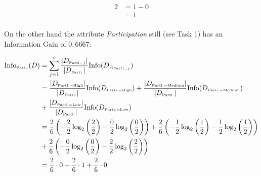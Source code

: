 \documentclass[
english,
smallborders
]{i6prcsht}
\newcommand{\OfSpecificValue}[3]{_{\text{\tiny #1#2#3}}}
\newcommand{\OfAttribute}[1]{_{\text{\tiny #1}}}
\begin{document}
\begin{solution}
\begin{alignat*}{2}
		                                  & = 1 - 0                                                                                                                                                                                                              \\
		                                  & = 1                                                                                                                                                                                                                  \\
	\end{alignat*}

	On the other hand the attribute \textit{Participation} still (see Task 1) has an Information Gain of $0,6667$:

	\begin{alignat*}{3}
		\text{Info}\OfAttribute{Parti.}(D) & = \sum_{j=1}^v \frac{|D\OfAttribute{Parti.$,j$}|}{|D\OfAttribute{Parti.}|} \text{Info}(D_{A\OfAttribute{Parti.$,j$}})                                                                                                                             \\
		                                   & = \frac{|D\OfSpecificValue{Parti.}{=}{High}|}{|D\OfAttribute{Parti.}|} \text{Info}(D\OfSpecificValue{Parti.}{=}{High}) + \frac{|D\OfSpecificValue{Parti.}{=}{Medium}|}{|D\OfAttribute{Parti.}|} \text{Info}(D\OfSpecificValue{Parti.}{=}{Medium}) \\
		                                   & + \frac{|D\OfSpecificValue{Parti.}{=}{Low}|}{|D\OfAttribute{Parti.}|} \text{Info}(D\OfSpecificValue{Parti.}{=}{Low})                                                                                                                              \\
		                                   & = \frac{2}{6} \left(-\frac{2}{2} \log_2\left(\frac{2}{2}\right) - \frac{0}{2} \log_2\left(\frac{0}{2}\right)\right) + \frac{2}{6} \left(-\frac{1}{2} \log_2\left(\frac{1}{2}\right) - \frac{1}{2} \log_2\left(\frac{1}{2}\right)\right)           \\
		                                   & + \frac{2}{6} \left(-\frac{0}{2} \log_2\left(\frac{0}{2}\right) - \frac{2}{2} \log_2\left(\frac{2}{2}\right)\right)                                                                                                                               \\
		                                   & = \frac{2}{6} \cdot 0 + \frac{2}{6} \cdot 1 + \frac{2}{6} \cdot 0                                                                                                                                                                                 \\

\end{alignat*}
\end{solution}
\end{document}
